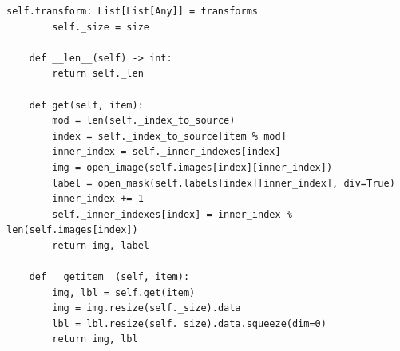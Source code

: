 \begin{lstlisting}[python]
        self.transform: List[List[Any]] = transforms
        self._size = size

    def __len__(self) -> int:
        return self._len

    def get(self, item):
        mod = len(self._index_to_source)
        index = self._index_to_source[item % mod]
        inner_index = self._inner_indexes[index]
        img = open_image(self.images[index][inner_index])
        label = open_mask(self.labels[index][inner_index], div=True)
        inner_index += 1
        self._inner_indexes[index] = inner_index % len(self.images[index])
        return img, label

    def __getitem__(self, item):
        img, lbl = self.get(item)
        img = img.resize(self._size).data
        lbl = lbl.resize(self._size).data.squeeze(dim=0)
        return img, lbl
\end{lstlisting}

\printbibliography[%
    heading=bibintoc%
]


